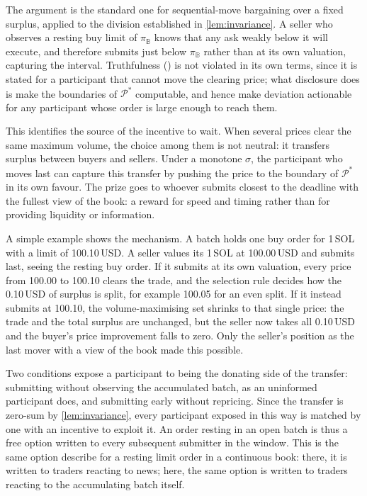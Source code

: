The argument is the standard one for sequential-move bargaining over a
fixed surplus, applied to the division established in
\eqref{lem:invariance}. A seller who observes a resting buy limit of
$\pi_{\mathbb{B}}$ knows that any ask weakly below it will execute, and
therefore submits just below $\pi_{\mathbb{B}}$ rather than at its own
valuation, capturing the interval. Truthfulness
() is not violated in its own terms, since it is
stated for a participant that cannot move the clearing price; what
disclosure does is make the boundaries of $\mathcal{P}^{*}$ computable, and
hence make deviation actionable for any participant whose order is large
enough to reach them.

This identifies the source of the incentive to wait. When several prices
clear the same maximum volume, the choice among them is not neutral: it
transfers surplus between buyers and sellers. Under a monotone $\sigma$,
the participant who moves last can capture this transfer by pushing the
price to the boundary of $\mathcal{P}^{*}$ in its own favour. The prize
goes to whoever submits closest to the deadline with the fullest view of
the book: a reward for speed and timing rather than for providing
liquidity or information.

A simple example shows the mechanism. A batch holds one buy order for
1\,SOL with a limit of 100.10\,USD. A seller values its 1\,SOL at
100.00\,USD and submits last, seeing the resting buy order. If it submits
at its own valuation, every price from 100.00 to 100.10 clears the trade,
and the selection rule decides how the 0.10\,USD of surplus is split, for
example 100.05 for an even split. If it instead submits at 100.10, the
volume-maximising set shrinks to that single price: the trade and the
total surplus are unchanged, but the seller now takes all 0.10\,USD and
the buyer's price improvement falls to zero. Only the seller's position as
the last mover with a view of the book made this possible.

Two conditions expose a participant to being the donating side of the
transfer: submitting without observing the accumulated batch, as an
uninformed participant does, and submitting early without repricing. Since
the transfer is zero-sum by \eqref{lem:invariance}, every participant
exposed in this way is matched by one with an incentive to exploit it. An
order resting in an open batch is thus a free option written to every
subsequent submitter in the window. This is the same option
\citet{copeland1983information} describe for a resting limit order in a
continuous book: there, it is written to traders reacting to news; here,
the same option is written to traders reacting to the accumulating batch
itself.

